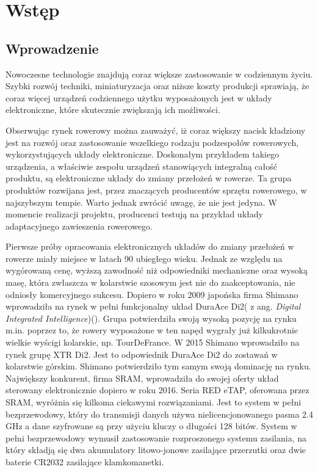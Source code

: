 \chapter{Wstęp}
\label{cha:Wstęp}

\section{Wprowadzenie}
\label{sec:Wprowadzenie}
Nowoczesne technologie znajdują coraz większe zastosowanie w codziennym życiu. Szybki rozwój techniki, miniaturyzacja oraz niższe koszty produkcji sprawiają, że coraz więcej urządzeń codziennego użytku wyposażonych jest w układy elektroniczne, które skutecznie zwiększają ich możliwości. 

Obserwując rynek rowerowy można zauważyć, iż coraz większy nacisk kładziony jest na rozwój oraz zastosowanie wszelkiego rodzaju podzespołów rowerowych, wykorzystujących układy elektroniczne. Doskonałym przykładem takiego urządzenia, a właściwie zespołu urządzeń stanowiących integralną całość produktu, są elektroniczne układy do zmiany przełożeń w rowerze. Ta grupa produktów rozwijana jest, przez znaczących producentów sprzętu rowerowego, w najszybszym tempie. Warto jednak zwrócić uwagę, że nie jest jedyna. W momencie realizacji projektu, producenci testują na przykład układy adaptacyjnego zawieszenia rowerowego.   

Pierwsze próby opracowania elektronicznych układów do zmiany przełożeń w rowerze miały miejsce w latach 90 ubiegłego wieku. Jednak ze względu na wygórowaną cenę, wyższą zawodność niż odpowiedniki mechaniczne oraz wysoką masę, która zwłaszcza w kolarstwie szosowym jest nie do zaakceptowania, nie odniosły komercyjnego sukcesu. Dopiero w roku 2009 japońska firma Shimano wprowadziła na rynek w pełni funkcjonalny układ DuraAce Di2( z ang. {\em Digital Integrated Intelligence})(\cite{shimanoHistory}). Grupa potwierdziła swoją wysoką pozycję na rynku m.in. poprzez to, że rowery wyposażone w ten napęd wygrały już kilkukrotnie wielkie wyścigi kolarskie, np. TourDeFrance. W 2015 Shimano wprowadziło na rynek grupę XTR Di2. Jest to odpowiednik DuraAce Di2 do zostawań w kolarstwie górskim. Shimano potwierdziło tym samym swoją dominację na rynku. Największy konkurent, firma SRAM, wprowadziła do swojej oferty układ sterowany elektronicznie dopiero w roku 2016. Seria RED eTAP, oferowana przez SRAM, wyróżnia się kilkoma ciekawymi rozwiązaniami. Jest to system w pełni bezprzewodowy, który do transmisji danych używa nielicencjonowanego pasma 2.4 GHz a dane szyfrowane są przy użyciu kluczy o długości 128 bitów. System w pełni bezprzewodowy wymusił zastosowanie rozproszonego systemu zasilania, na który składją się dwa akumulatory litowo-jonowe zasilające przerzutki oraz dwie baterie CR2032 zasilające klamkomanetki\cite{bikeWorld}.

